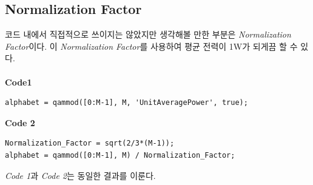 \documentclass{article}
\newcommand{\bd}{\textbf} %
\begin{document}
\subsection{Normalization Factor}
코드 내에서 직접적으로 쓰이지는 않았지만 생각해볼 만한 부분은 \textsl{Normalization Factor}이다. 이 \textsl{Normalization Factor}를 사용하여 평균 전력이 1W가 되게끔 할 수 있다.\\
\\
\bd{Code1}
\begin{lstlisting}[style=Matlab-editor, frame=single]
alphabet = qammod([0:M-1], M, 'UnitAveragePower', true);
\end{lstlisting}
\vspace{0.1cm}
\bd{Code 2}
\begin{lstlisting}[style=Matlab-editor, frame=single]
Normalization_Factor = sqrt(2/3*(M-1));
alphabet = qammod([0:M-1], M) / Normalization_Factor;
\end{lstlisting}
\textsl{Code 1}과 \textsl{Code 2}는 동일한 결과를 이룬다.\\
\end{document}
